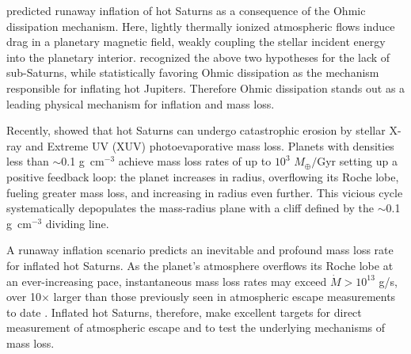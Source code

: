 \documentclass[twocolumn]{aastex631}
\begin{document}
\citet{2011ApJ...738....1B} predicted runaway inflation of hot Saturns as a consequence of the Ohmic dissipation mechanism.  Here, lightly thermally ionized atmospheric flows induce drag in a planetary magnetic field, weakly coupling the stellar incident energy into the planetary interior.  \citet{2018AJ....155..214T} recognized the above two hypotheses for the lack of sub-Saturns, while statistically favoring Ohmic dissipation as the mechanism responsible for inflating hot Jupiters.  Therefore Ohmic dissipation stands out as a leading physical mechanism for inflation and mass loss.

Recently, \citet{2023ApJ...945L..36T} showed that hot Saturns can undergo catastrophic erosion by stellar X-ray and Extreme UV (XUV) photoevaporative mass loss. Planets with densities less than $\sim$0.1 g~cm$^{-3}$ achieve mass loss rates of up to $10^3$ $M_\oplus /$Gyr setting up a positive feedback loop: the planet increases in radius, overflowing its Roche lobe, fueling greater mass loss, and increasing in radius even further.  This vicious cycle systematically depopulates the mass-radius plane with a cliff defined by the $\sim$0.1 g~cm$^{-3}$ dividing line.

A runaway inflation scenario predicts an inevitable and profound mass loss rate for inflated hot Saturns.  As the planet's atmosphere overflows its Roche lobe at an ever-increasing pace, instantaneous mass loss rates may exceed $\dot{M}>10^{13}$ g/s, over 10$\times$ larger than those previously seen in atmospheric escape measurements to date \citep{2022arXiv221116243D}.  Inflated hot Saturns, therefore, make excellent targets for direct measurement of atmospheric escape and to test the underlying mechanisms of mass loss.
\end{document}
